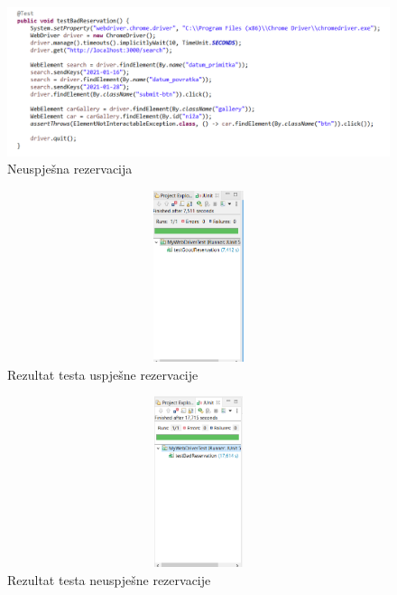 			\begin{figure}[hp]
                    \centering
                    \includegraphics[width=15cm]{slike/kodlosarezervacija.png}
                    \caption{Neuspješna rezervacija}
                    \label{fig:useCase-2}
                \end{figure}
			\eject
			
			\begin{figure}[hp]
                    \centering
                    \includegraphics[width=15cm, height=5cm]{slike/reservationgood.png}
                    \caption{Rezultat testa uspješne rezervacije}
                    \label{fig:useCase-2}
                \end{figure}
			\eject
			
			\begin{figure}[hp]
                    \centering
                    \includegraphics[width=15cm, height=5cm]{slike/reservationbad.png}
                    \caption{Rezultat testa neuspješne rezervacije}
                    \label{fig:useCase-2}
                \end{figure}
			\eject
			
